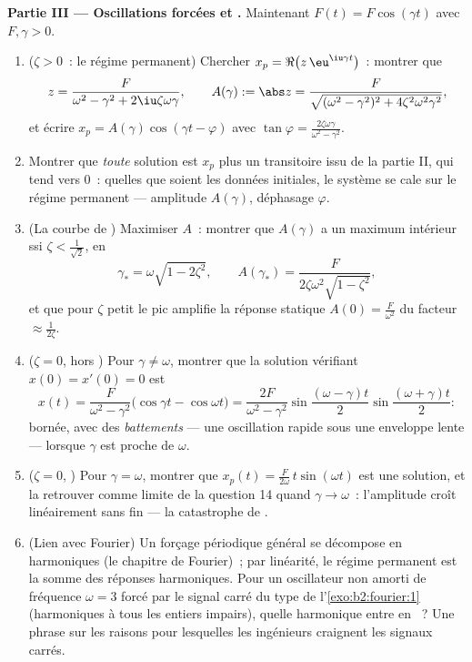 \begin{problem}
\medskip
\noindent\textbf{Partie III --- Oscillations forcées et
.} Maintenant $F(t) = F\cos(\gamma t)$ avec $F, \gamma > 0$.
\begin{enumerate}[resume]
  \item ($\zeta > 0$~: le régime permanent) Chercher $x_p =
        \Re\bigl(z\,\eu^{\iu\gamma t}\bigr)$~: montrer que
        \[
        z = \frac{F}{\omega^2 - \gamma^2 +
        2\iu\zeta\omega\gamma},
        \qquad
        A(\gamma) := \abs z = \frac{F}{\sqrt{(\omega^2 -
        \gamma^2)^2 + 4\zeta^2\omega^2\gamma^2}} ,
        \]
        et écrire $x_p = A(\gamma)\cos(\gamma t - \varphi)$
        avec $\tan\varphi =
        \frac{2\zeta\omega\gamma}{\omega^2-\gamma^2}$.
  \item Montrer que \emph{toute} solution est $x_p$ plus un
        transitoire issu de la partie II, qui tend vers $0$~:
        quelles que soient les données initiales, le système se
        cale sur le régime permanent --- amplitude $A(\gamma)$,
        déphasage $\varphi$.
  \item (La courbe de ) Maximiser $A$~: montrer que
        $A(\gamma)$ a un maximum intérieur ssi $\zeta <
        \frac{1}{\sqrt2}$, en
        \[
        \gamma_* = \omega\sqrt{1 - 2\zeta^2},
        \qquad
        A(\gamma_*) =
        \frac{F}{2\zeta\omega^2\sqrt{1-\zeta^2}} ,
        \]
        et que pour $\zeta$ petit le pic amplifie la réponse
        statique $A(0) = \frac F{\omega^2}$ du facteur $\approx
        \frac{1}{2\zeta}$.
  \item ($\zeta = 0$, hors ) Pour $\gamma \neq \omega$,
        montrer que la solution vérifiant $x(0) = x'(0) = 0$ est
        \[
        x(t) = \frac{F}{\omega^2 -
        \gamma^2}\bigl(\cos\gamma t - \cos\omega t\bigr)
        = \frac{2F}{\omega^2-\gamma^2}
        \sin\frac{(\omega-\gamma)t}{2}
        \sin\frac{(\omega+\gamma)t}{2} :
        \]
        bornée, avec des \emph{battements} --- une oscillation
        rapide sous une enveloppe lente --- lorsque $\gamma$ est
        proche de $\omega$.
  \item ($\zeta = 0$, ) Pour $\gamma = \omega$, montrer
        que $x_p(t) = \frac{F}{2\omega}\,t\sin(\omega t)$ est
        une solution, et la retrouver comme limite de la question
        14 quand $\gamma \to \omega$~: l'amplitude croît
        linéairement sans fin --- la catastrophe de .
  \item (Lien avec Fourier) Un forçage périodique général se
        décompose en harmoniques (le chapitre de Fourier)~; par
        linéarité, le régime permanent est la somme des réponses
        harmoniques. Pour un oscillateur non amorti de fréquence
        $\omega = 3$ forcé par le signal carré du type de
        l'\cref{exo:b2:fourier:1} (harmoniques à tous les entiers
        impairs), quelle harmonique entre en ~? Une
        phrase sur les raisons pour lesquelles les ingénieurs
        craignent les signaux carrés.
\end{enumerate}


\end{problem}
